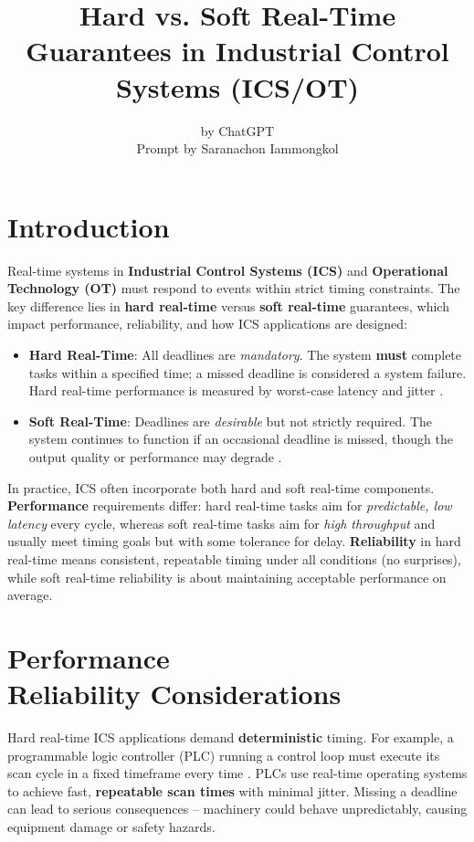 \documentclass{article}
\title{Hard vs. Soft Real-Time Guarantees in Industrial Control Systems (ICS/OT)}
\author{by ChatGPT \\ \small Prompt by Saranachon Iammongkol}
\begin{document}
\maketitle

\section{Introduction}
Real-time systems in \textbf{Industrial Control Systems (ICS)} and \textbf{Operational Technology (OT)} must respond to events within strict timing constraints. The key difference lies in \textbf{hard real-time} versus \textbf{soft real-time} guarantees, which impact performance, reliability, and how ICS applications are designed:

\begin{itemize}
    \item \textbf{Hard Real-Time}: All deadlines are \emph{mandatory}. The system \textbf{must} complete tasks within a specified time; a missed deadline is considered a system failure. Hard real-time performance is measured by worst-case latency and jitter \cite{intel_realtime}.
    \item \textbf{Soft Real-Time}: Deadlines are \emph{desirable} but not strictly required. The system continues to function if an occasional deadline is missed, though the output quality or performance may degrade \cite{intel_realtime}.
\end{itemize}

In practice, ICS often incorporate both hard and soft real-time components. \textbf{Performance} requirements differ: hard real-time tasks aim for \textit{predictable, low latency} every cycle, whereas soft real-time tasks aim for \textit{high throughput} and usually meet timing goals but with some tolerance for delay. \textbf{Reliability} in hard real-time means consistent, repeatable timing under all conditions (no surprises), while soft real-time reliability is about maintaining acceptable performance on average.

\section{Performance \\ Reliability Considerations}
Hard real-time ICS applications demand \textbf{deterministic} timing. For example, a programmable logic controller (PLC) running a control loop must execute its scan cycle in a fixed timeframe every time \cite{plc_whitepaper}. PLCs use real-time operating systems to achieve fast, \textbf{repeatable scan times} with minimal jitter. Missing a deadline can lead to serious consequences – machinery could behave unpredictably, causing equipment damage or safety hazards.
\end{document}
